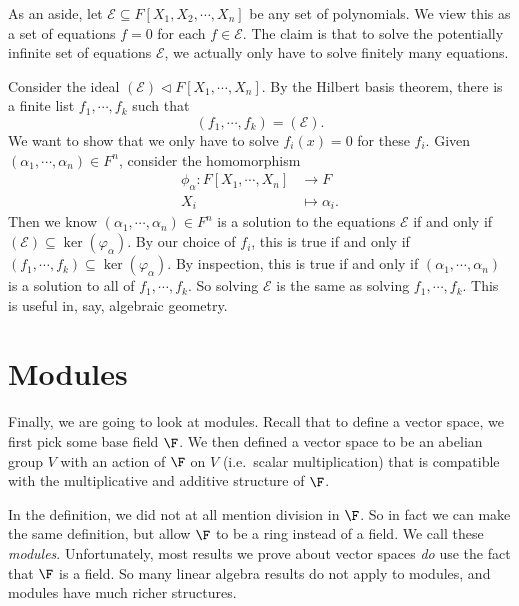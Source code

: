 \documentclass[a4paper]{article}
\begin{document}
As an aside, let $\mathcal{E} \subseteq F[X_1, X_2, \cdots, X_n]$ be any set of polynomials. We view this as a set of equations $f = 0$ for each $f \in \mathcal{E}$. The claim is that to solve the potentially infinite set of equations $\mathcal{E}$, we actually only have to solve finitely many equations.

Consider the ideal $(\mathcal{E}) \lhd F[X_1, \cdots, X_n]$. By the Hilbert basis theorem, there is a finite list $f_1, \cdots, f_k$ such that
\[
  (f_1, \cdots, f_k) = (\mathcal{E}).
\]
We want to show that we only have to solve $f_i(x) = 0$ for these $f_i$. Given $(\alpha_1, \cdots, \alpha_n) \in F^n$, consider the homomorphism
\begin{align*}
  \phi_\alpha: F[X_1, \cdots, X_n] &\to F\\
  X_i &\mapsto \alpha_i.
\end{align*}
Then we know $(\alpha_1, \cdots, \alpha_n) \in F^n$ is a solution to the equations $\mathcal{E}$ if and only if $(\mathcal{E}) \subseteq \ker(\varphi_\alpha)$. By our choice of $f_i$, this is true if and only if $(f_1, \cdots, f_k) \subseteq \ker(\varphi_\alpha)$. By inspection, this is true if and only if $(\alpha_1, \cdots, \alpha_n)$ is a solution to all of $f_1, \cdots, f_k$. So solving $\mathcal{E}$ is the same as solving $f_1, \cdots, f_k$. This is useful in, say, algebraic geometry.

\section{Modules}
Finally, we are going to look at modules. Recall that to define a vector space, we first pick some base field $\F$. We then defined a vector space to be an abelian group $V$ with an action of $\F$ on $V$ (i.e.\ scalar multiplication) that is compatible with the multiplicative and additive structure of $\F$.

In the definition, we did not at all mention division in $\F$. So in fact we can make the same definition, but allow $\F$ to be a ring instead of a field. We call these \emph{modules}. Unfortunately, most results we prove about vector spaces \emph{do} use the fact that $\F$ is a field. So many linear algebra results do not apply to modules, and modules have much richer structures.
\end{document}

